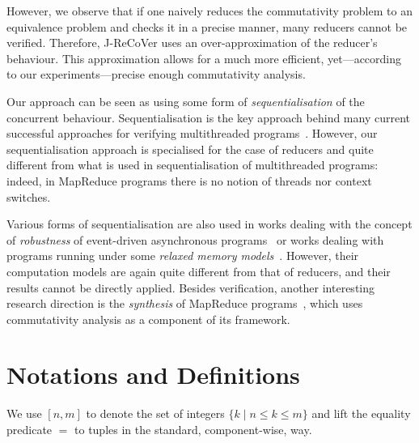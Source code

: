 \documentclass{llncs}
\newcommand{\Var}{\mathtt{Var}}
\newcommand{\Exp}{\mathtt{Exp}}
\newcommand{\Cmd}{\mathtt{Cmd}}
\newcommand{\Grd}{\mathtt{Grd}}
\newcommand{\Prg}{\mathtt{Prg}}
\newcommand{\cur}{cur()}
\newcommand{\ite}[3]{
	 \ifmmode
	 \mathbf{if}\ #1 \ \mathbf{then}\ #2\  \mathbf{else}\ #3
	 \else
	 \textbf{if}\ #1 \ \textbf{then}\ #2\  \textbf{else}\ #3
	 \fi}
\newcommand{\rloop}{
	\ifmmode
	\mathbf{Loop}
	\else
	\textbf{Loop}
	\fi}
\newcommand{\Z}{\mathbb{Z}}
\begin{document}
However, we observe that if one naively reduces the commutativity problem to
an equivalence problem and checks it in a precise manner, many reducers cannot
be verified. Therefore, J-ReCoVer uses an over-approximation of the reducer's
behaviour. This approximation allows for a much more efficient, yet---according
to our experiments---precise enough commutativity analysis.

Our approach can be seen as using some form of \emph{sequentialisation} of the
concurrent behaviour. Sequentialisation is the key approach behind many current
successful approaches for verifying multithreaded
programs~\cite{LalReps:Seq:08,LazyCSeq14}. However, our sequentialisation
approach is specialised for the case of reducers and quite different from what
is used in sequentialisation of multithreaded programs: indeed, in MapReduce
programs there is no notion of threads nor context switches.

Various forms of sequentialisation are also used in works dealing with the concept 
of \emph{robustness} of event-driven
asynchronous programs~\cite{ahmed2017:robustness} or works dealing with programs
running under some \emph{relaxed memory
models}~\cite{ahmed2013:robustness,AbdullaACLR13,AbdullaACLR12}. However, their
computation models are again quite different from that of reducers, and
their results cannot be directly applied.
Besides verification, another interesting research direction is the
\emph{synthesis} of MapReduce programs~\cite{SmithA16}, which uses commutativity analysis
as a component of its framework.

\section{Notations and Definitions} \label{section:integer-reducers}

We use $[n,m]$ to denote the set of integers $\{k\mid n \leq k\leq m\}$ and lift
the equality predicate $=$ to tuples in the standard, component-wise, way.

\end{document}

